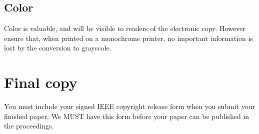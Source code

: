 \documentclass[10pt,twocolumn,letterpaper]{article}
\begin{document}
\subsection{Color}

Color is valuable, and will be visible to readers of the electronic copy.
However ensure that, when printed on a monochrome printer, no important
information is lost by the conversion to grayscale.

\section{Final copy}

You must include your signed IEEE copyright release form when you submit
your finished paper. We MUST have this form before your paper can be
published in the proceedings.


{\small


}
\end{document}

